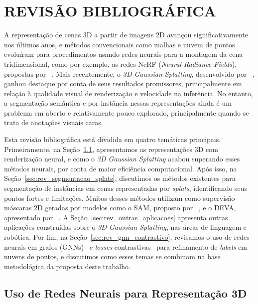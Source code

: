 \chapter{REVISÃO BIBLIOGRÁFICA}

A representação de cenas 3D a partir de imagens 2D avançou significativamente nos últimos anos, e métodos convencionais como malhas e nuvem de pontos evoluíram para procedimentos usando redes neurais para a montagem da cena tridimensional, como por exemplo, as redes NeRF (\emph{Neural Radiance Fields}), propostas por ~\citeauthor{mildenhall2021nerf}. Mais recentemente, o \textit{3D Gaussian Splatting}, desenvolvido por ~\citeauthor{kerbl20233d}, ganhou destaque por conta de seus resultados promissores, principalmente em relação à qualidade visual de renderização e velocidade na inferência. No entanto, a segmentação semântica e por instância nessas representações ainda é um problema em aberto e relativamente pouco explorado, principalmente quando se trata de anotações visuais caras.

Esta revisão bibliográfica está dividida em quatro temáticas principais. Primeiramente, na Seção~\ref{sec:rev_representacao_3d}, apresentamos as representações 3D com renderização neural, e como o \textit{3D Gaussian Splatting} acabou superando esses métodos neurais, por conta de maior eficiência computacional. Após isso, na Seção~\ref{sec:rev_segmentacao_splats}, discutimos os métodos existentes para segmentação de instâncias em cenas representadas por \emph{splats}, identificando seus pontos fortes e limitações. Muitos desses métodos utilizam como supervisão máscaras 2D geradas por modelos como o SAM, proposto por ~\citeauthor{kirillov2023segment}, e o DEVA, apresentado por ~\citeauthor{cheng2023tracking}. A Seção~\ref{sec:rev_outras_aplicacoes} apresenta outras aplicações construídas sobre o \textit{3D Gaussian Splatting}, nas áreas de linguagem e robótica. Por fim, na Seção~\ref{sec:rev_gnn_contrastivo}, revisamos o uso de redes neurais em grafos (GNNs)~\cite{scarselli2008graph} e \emph{losses} contrastivas~\cite{oord2018representation} para refinamento de \textit{labels} em nuvens de pontos, e discutimos como esses temas se combinam na base metodológica da proposta deste trabalho.

\section{Uso de Redes Neurais para Representação 3D}
\label{sec:rev_representacao_3d}

